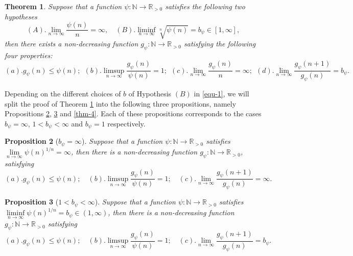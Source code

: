 \documentclass[12pt,reqno]{amsart}
\renewcommand{\=}{\coloneqq}
\theoremstyle{plain}
\newtheorem{theorem}{Theorem}[section]
\newtheorem{prop}[theorem]{Proposition}
\begin{document}
\begin{theorem}\label{thm-1}
Suppose that a function $\psi : \mathbb{N} \to \mathbb{R}_{>0}$ satisfies the following two hypotheses
\begin{equation*}\label{equ-1}
(A). \lim_{n\to \infty} \frac{\psi(n)}{n} = \infty, \quad (B). \liminf_{n\to \infty} \sqrt[n]{\psi(n)} = b_{\psi} \in [1, \infty],
\end{equation*}
then there exists a non-decreasing function $g_\psi : \mathbb{N} \to \mathbb{R}_{>0}$ satisfying the following four properties:
\begin{equation*}\label{equ-2}
(a). g_\psi(n) \leq \psi(n);~~(b). \limsup_{n\to \infty} \frac{g_\psi(n)}{\psi(n)} = 1;~~ (c). \lim_{n\to \infty} \frac{g_\psi(n)}{n} = \infty;~~(d). \lim_{n\to \infty} \frac{g_\psi(n+1)}{g_\psi(n)} = b_{\psi}.
\end{equation*}
\end{theorem}
Depending on the different choices of $b$ of Hypothesis $(B)$ in \eqref{equ-1}, we will split the proof of Theorem \ref{thm-1} into the following three propositions, namely Propositions \ref{thm-2}, \ref{thm-3} and \ref{thm-4}. Each of these propositions corresponds to the cases $b_{\psi}=\infty$, $1<b_{\psi}<\infty$ and $b_{\psi}=1$ respectively.
\begin{prop}[$b_{\psi}=\infty$]\label{thm-2}
Suppose that a function $\psi: \mathbb{N} \to \mathbb{R}_{>0}$ satisfies $\lim\limits_{n\to\infty}\psi(n)^{1/n}=\infty$, then there is a non-decreasing function $g_\psi: \mathbb{N} \to \mathbb{R}_{>0}$, satisfying
\begin{equation*}\label{equ-3}
(a). g_\psi(n) \leq \psi(n); \quad (b). \limsup_{n\to \infty}\frac{g_\psi(n)}{\psi(n)}=1; \quad (c). \lim_{n\to \infty} \frac{g_\psi(n+1)}{g_\psi(n)}=\infty.
\end{equation*}
\end{prop}
\begin{prop}[$1<b_{\psi}<\infty$]\label{thm-3}
Suppose that a function $\psi: \mathbb{N} \to \mathbb{R}_{>0}$ satisfies $\liminf\limits_{n\to\infty}\psi(n)^{1/n}=b_{\psi}\in (1,\infty)$, then there is a non-decreasing function $g_\psi: \mathbb{N} \to \mathbb{R}_{>0}$ satisfying
\begin{equation*}\label{equ-4}
(a). g_\psi(n) \leq \psi(n); \quad (b). \limsup_{n\to \infty} \frac{g_\psi(n)}{\psi(n)} = 1; \quad (c). \lim_{n\to \infty} \frac{g_\psi(n+1)}{g_\psi(n)} = b_{\psi}.
\end{equation*}
\end{prop}
\end{document}
